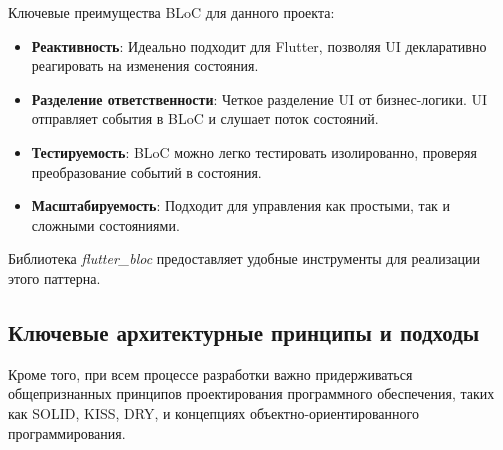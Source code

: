 Ключевые преимущества BLoC для данного проекта:
\begin{itemize}
    \item \textbf{Реактивность}: Идеально подходит для Flutter, позволяя UI декларативно реагировать на изменения состояния.
    \item \textbf{Разделение ответственности}: Четкое разделение UI от бизнес-логики. UI отправляет события в BLoC и слушает поток состояний.
    \item \textbf{Тестируемость}: BLoC можно легко тестировать изолированно, проверяя преобразование событий в состояния.
    \item \textbf{Масштабируемость}: Подходит для управления как простыми, так и сложными состояниями.
\end{itemize}
Библиотека \textit{flutter\_bloc} предоставляет удобные инструменты для реализации этого паттерна.



\subsection*{Ключевые архитектурные принципы и подходы}

Кроме того, при всем процессе разработки важно придерживаться общепризнанных принципов проектирования программного обеспечения, таких как SOLID, KISS, DRY, и концепциях объектно-ориентированного программирования.  


